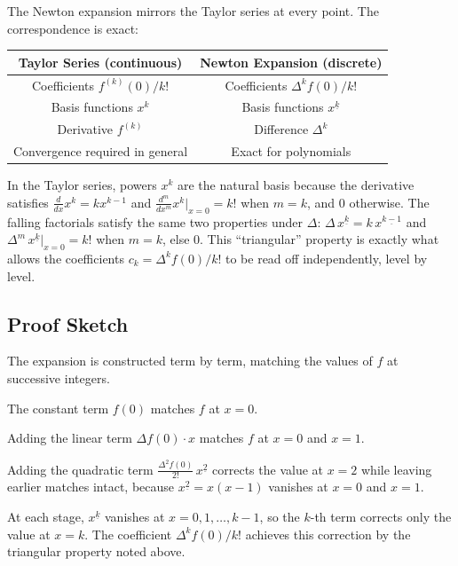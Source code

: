 \begin{exposition}
The Newton expansion mirrors the Taylor series at every point. The
correspondence is exact:

\begin{center}
\renewcommand{\arraystretch}{1.5}
\begin{tabular}{|c|c|}
\hline
\textbf{Taylor Series (continuous)} & \textbf{Newton Expansion (discrete)} \\
\hline
Coefficients \(f^{(k)}(0)/k!\) & Coefficients \(\Delta^k f(0)/k!\) \\
Basis functions \(x^k\) & Basis functions \(x^{\underline{k}}\) \\
Derivative \(f^{(k)}\) & Difference \(\Delta^k\) \\
Convergence required in general & Exact for polynomials \\
\hline
\end{tabular}
\end{center}
\end{exposition}

\begin{remark*}[Interpretation]
In the Taylor series, powers \(x^k\) are the natural basis because
the derivative satisfies \(\tfrac{d}{dx}x^k = kx^{k-1}\) and
\(\tfrac{d^m}{dx^m}x^k\big|_{x=0} = k!\) when \(m=k\), and \(0\) otherwise.
The falling factorials satisfy the same two properties under \(\Delta\):
\(\Delta\,x^{\underline{k}} = k\,x^{\underline{k-1}}\) and
\(\Delta^m\,x^{\underline{k}}\big|_{x=0} = k!\) when \(m=k\), else \(0\).
This ``triangular'' property is exactly what allows the coefficients
\(c_k = \Delta^k f(0)/k!\) to be read off independently, level by level.
\end{remark*}

\subsection*{Proof Sketch}

\begin{exposition}
The expansion is constructed term by term, matching the values of \(f\) at
successive integers.

The constant term \(f(0)\) matches \(f\) at \(x = 0\).

Adding the linear term \(\Delta f(0)\cdot x\) matches \(f\) at \(x = 0\)
and \(x = 1\).

Adding the quadratic term \(\tfrac{\Delta^2 f(0)}{2!}\,x^{\underline{2}}\)
corrects the value at \(x = 2\) while leaving earlier matches intact,
because \(x^{\underline{2}} = x(x-1)\) vanishes at \(x = 0\) and \(x = 1\).

At each stage, \(x^{\underline{k}}\) vanishes at \(x = 0, 1, \dots, k-1\),
so the \(k\)-th term corrects only the value at \(x = k\). The coefficient
\(\Delta^k f(0)/k!\) achieves this correction by the triangular property
noted above.
\end{exposition}

